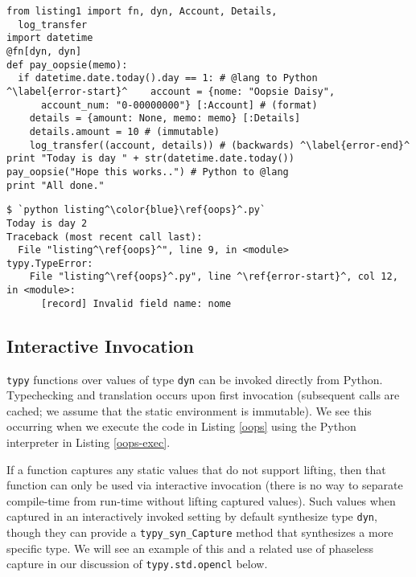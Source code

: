 \documentclass{sigplanconf}
\newcommand{\lip}[1]{\lstinline[language=Python,basicstyle=\ttfamily\small,deletendkeywords={tuple,buffer,map}]{#1}}
\begin{document}
\begin{codelisting}[t]
\begin{lstlisting}
from listing1 import fn, dyn, Account, Details, 
  log_transfer
import datetime
@fn[dyn, dyn]
def pay_oopsie(memo):
  if datetime.date.today().day == 1: # @lang to Python
^\label{error-start}^    account = {nome: "Oopsie Daisy", 
      account_num: "0-00000000"} [:Account] # (format)
    details = {amount: None, memo: memo} [:Details]
    details.amount = 10 # (immutable)
    log_transfer((account, details)) # (backwards) ^\label{error-end}^
print "Today is day " + str(datetime.date.today())
pay_oopsie("Hope this works..") # Python to @lang
print "All done."
\end{lstlisting}
\caption{[\texttt{listing\ref{oops}.py}] Lines \ref{error-start}-\ref{error-end} each have a type error.}
\label{oops}
\end{codelisting}
\begin{codelisting}[t]
\begin{lstlisting}[style=Bash]
$ `python listing^\color{blue}\ref{oops}^.py`
Today is day 2
Traceback (most recent call last):
  File "listing^\ref{oops}^", line 9, in <module>
typy.TypeError: 
    File "listing^\ref{oops}^.py", line ^\ref{error-start}^, col 12, in <module>: 
      [record] Invalid field name: nome
\end{lstlisting}
\caption{Execution never proceeds into a function with a type error when using \texttt{typy} for implicit compilation.}
\label{oops-exec}
\end{codelisting}

\subsection{Interactive Invocation}\label{interactive} \texttt{typy} functions over values of type \lip{dyn} can be invoked directly from Python. Typechecking and translation occurs upon first invocation (subsequent calls are cached; we assume that the static environment is immutable). We see this occurring when we execute the code in Listing \ref{oops} using the Python interpreter in Listing \ref{oops-exec}. 

If a function captures any static values that do not support lifting, then that function can only be used via interactive invocation (there is no way to separate compile-time from run-time without lifting captured values). Such values when captured in an interactively invoked setting by default synthesize type \lip{dyn}, though they can provide a \lip{typy_syn_Capture} method that synthesizes a more specific type. We will see an example of this and a related use of phaseless capture in our discussion of \lip{typy.std.opencl} below.
\end{document}
